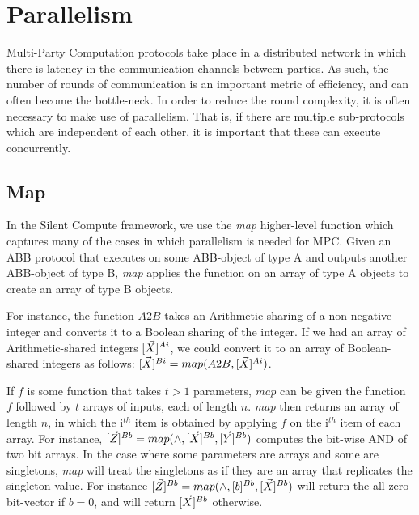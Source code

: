 \section{Parallelism}

Multi-Party Computation protocols take place in a distributed network
in which there is latency in the communication channels between parties.
As such, the number of rounds of communication is an important metric
of efficiency, and can often become the bottle-neck.
In order to reduce the round complexity, it is often necessary to make
use of parallelism.
That is, if there are multiple sub-protocols which are independent of
each other, it is important that these can execute concurrently.

\subsection{Map}

In the Silent Compute framework, we use the \textit{map} higher-level function
which captures many of the cases in which parallelism is needed for MPC.
Given an ABB protocol that executes on some ABB-object of type A
and outputs another ABB-object of type B,
\textit{map} applies the function on an array of type A objects
to create an array of type B objects.

For instance, the function $A2B$ takes an Arithmetic sharing of a
non-negative integer and converts it to a Boolean sharing of the integer.
If we had an array of Arithmetic-shared integers $[\vec{X}]^{Ai}$,
we could convert it to an array of Boolean-shared integers as follows:
$[\vec{X}]^{Bi} = map(A2B, [\vec{X}]^{Ai})$.

If $f$ is some function that takes $t>1$ parameters,
\textit{map} can be given the function $f$ followed by
$t$ arrays of inputs, each of length $n$.
\textit{map} then returns an array of length $n$,
in which the i$^{th}$ item is obtained by applying $f$
on the i$^{th}$ item of each array.
For instance, $[\vec{Z}]^{Bb} = map(\wedge, [\vec{X}]^{Bb}, [\vec{Y}]^{Bb})$
computes the bit-wise AND of two bit arrays. 
In the case where some parameters are arrays and some are singletons,
\textit{map} will treat the singletons as if they are an
array that replicates the singleton value.
For instance $[\vec{Z}]^{Bb} = map(\wedge, [b]^{Bb}, [\vec{X}]^{Bb})$
will return the all-zero bit-vector if $b=0$,
and will return $[\vec{X}]^{Bb}$ otherwise.

